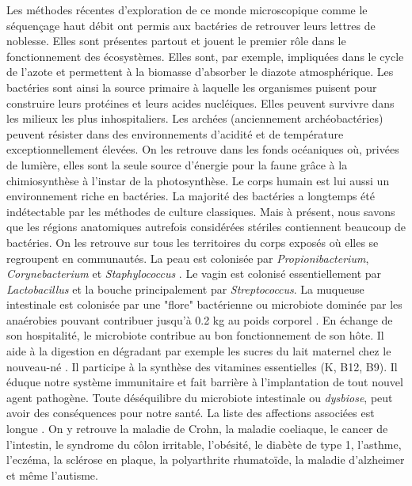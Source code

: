\documentclass[12pt,a4paper]{article}
\begin{document}
Les méthodes récentes d'exploration de ce monde microscopique comme le séquençage haut débit ont permis aux bactéries de retrouver leurs lettres de noblesse.
Elles sont présentes partout et jouent le premier rôle dans le fonctionnement des écosystèmes. Elles sont, par exemple, impliquées dans le cycle de l'azote et permettent à la biomasse d'absorber le diazote atmosphérique. Les bactéries sont ainsi la source primaire à laquelle les organismes puisent pour construire leurs protéines et leurs acides nucléiques.
Elles peuvent survivre dans les milieux les plus inhospitaliers. Les archées (anciennement archéobactéries) peuvent résister dans des environnements d'acidité et de température exceptionnellement élevées. On les retrouve dans les fonds océaniques où, privées de lumière, elles sont la seule source d'énergie pour la faune grâce à la chimiosynthèse à l'instar de la photosynthèse. 
Le corps humain est lui aussi un environnement riche en bactéries. La majorité des bactéries a longtemps été indétectable par les méthodes de culture classiques. Mais à présent, nous savons que les régions anatomiques autrefois considérées stériles contiennent beaucoup de bactéries. 
On les retrouve sur tous les territoires du corps exposés où elles se regroupent en communautés.
La peau est colonisée par \textit{Propionibacterium}, \textit{Corynebacterium} et \textit{Staphylococcus} \cite{Yong2017}. Le vagin est colonisé essentiellement par \textit{Lactobacillus} et la bouche principalement par \textit{Streptococcus}\cite{Yong2017}.
La muqueuse intestinale est colonisée par une "flore" bactérienne ou microbiote dominée par les anaérobies pouvant contribuer jusqu'à 0.2 kg au poids corporel \citep{Sender2016}.
En échange de son hospitalité, le microbiote contribue au bon fonctionnement de son hôte. Il aide à la digestion en dégradant par exemple les sucres du lait maternel chez le nouveau-né \cite{Bode2012,Yong2017}. Il participe à la synthèse des vitamines essentielles (K, B12, B9)\cite{LeBlanc2013,Yong2017}. Il éduque notre système immunitaire et fait barrière à l'implantation de tout nouvel agent pathogène.
Toute déséquilibre du microbiote intestinale ou \textit{dysbiose}, peut avoir des conséquences pour notre santé. La liste des affections associées est longue \cite{Yong2017}. On y retrouve la maladie de Crohn, la maladie coeliaque, le cancer de l’intestin, le syndrome du côlon irritable, l’obésité, le diabète de type 1, l’asthme, l’eczéma, la sclérose en plaque, la polyarthrite rhumatoïde, la maladie d’alzheimer et même l’autisme. \\
\end{document}
